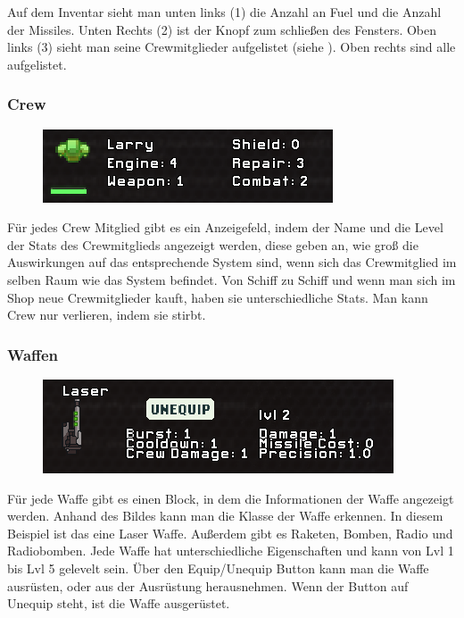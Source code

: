\documentclass[fontsize=12pt,paper=a4,twoside]{scrartcl}
\begin{document}
Auf dem Inventar sieht man unten links (1) die Anzahl an Fuel und die Anzahl der Missiles. Unten Rechts (2) ist der Knopf zum schließen des Fensters. Oben links (3) sieht man seine Crewmitglieder aufgelistet (siehe ). Oben rechts sind alle  aufgelistet. 

\subsubsection{Crew}\label{sec:Crew}

\begin{figure}[H]
\centering
\includegraphics[width=0.8\linewidth]{DasSpiel/Inventar/crew.png}
\end{figure} 

Für jedes Crew Mitglied gibt es ein Anzeigefeld, indem der Name und die Level der Stats des Crewmitglieds angezeigt werden, diese geben an, wie groß die Auswirkungen auf das entsprechende System sind, wenn sich das Crewmitglied im selben Raum wie das System befindet. Von Schiff zu Schiff und wenn man sich im Shop neue Crewmitglieder kauft, haben sie unterschiedliche Stats. Man kann Crew nur verlieren, indem sie stirbt. 


\subsubsection{Waffen} \label{sec:Waffen}

\begin{figure}[H]
\centering
\includegraphics[width=0.8\linewidth]{DasSpiel/Inventar/waffe.png}
\end{figure} 

Für jede Waffe gibt es einen Block, in dem die Informationen der Waffe angezeigt werden. Anhand des Bildes kann man die Klasse der Waffe erkennen. In diesem Beispiel ist das eine Laser Waffe. Außerdem gibt es Raketen, Bomben, Radio und Radiobomben. Jede Waffe hat unterschiedliche Eigenschaften und kann von Lvl 1 bis Lvl 5 gelevelt sein. Über den Equip/Unequip Button kann man die Waffe ausrüsten, oder aus der Ausrüstung herausnehmen. Wenn der Button auf Unequip steht, ist die Waffe ausgerüstet. 
\end{document}
